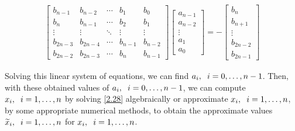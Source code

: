 \documentclass[a4paper]{article}
\numberwithin{equation}{section}
\begin{document}
\begin{align}
\label{2.36}
\left[ {\begin{array}{*{20}{c}}
{{b_{n - 1}}}&{{b_{n - 2}}}& \cdots &{{b_1}}&{{b_0}}\\
{{b_n}}&{{b_{n - 1}}}& \cdots &{{b_2}}&{{b_1}}\\
 \vdots & \vdots & \ddots & \vdots & \vdots \\
{{b_{2n - 3}}}&{{b_{2n - 4}}}& \cdots &{{b_{n - 1}}}&{{b_{n - 2}}}\\
{{b_{2n - 2}}}&{{b_{2n - 3}}}& \cdots &{{b_n}}&{{b_{n - 1}}}
\end{array}} \right]\left[ {\begin{array}{*{20}{c}}
{{a_{n - 1}}}\\
{{a_{n - 2}}}\\
 \vdots \\
{{a_1}}\\
{{a_0}}
\end{array}} \right] =  - \left[ {\begin{array}{*{20}{c}}
{{b_n}}\\
{{b_{n + 1}}}\\
 \vdots \\
{{b_{2n - 2}}}\\
{{b_{2n - 1}}}
\end{array}} \right]
\end{align}

Solving this linear system of equations, we can find $a_i,\hspace{0.2cm}i=0,\ldots,n-1$. Then, with these obtained values of $a_i,\hspace{0.2cm}i=0,\ldots,n-1$, we can compute $x_i,\hspace{0.2cm}i=1,\ldots,n$ by solving \eqref{2.28} algebraically or approximate $x_i,\hspace{0.2cm}i=1,\ldots,n$, by some appropriate numerical methods, to obtain the approximate values ${\widetilde x_i},\hspace{0.2cm}i = 1, \ldots ,n$ for $x_i,\hspace{0.2cm}i=1,\ldots,n$.
\end{document}

